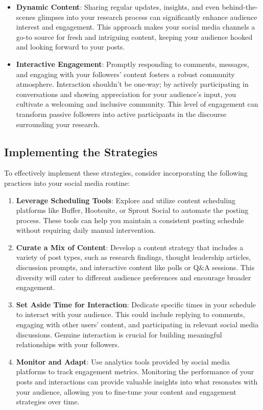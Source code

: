 \documentclass[
]{book}
\begin{document}
\begin{itemize}
\item
  \textbf{Dynamic Content}: Sharing regular updates, insights, and even behind-the-scenes glimpses into your research process can significantly enhance audience interest and engagement. This approach makes your social media channels a go-to source for fresh and intriguing content, keeping your audience hooked and looking forward to your posts.
\item
  \textbf{Interactive Engagement}: Promptly responding to comments, messages, and engaging with your followers' content fosters a robust community atmosphere. Interaction shouldn't be one-way; by actively participating in conversations and showing appreciation for your audience's input, you cultivate a welcoming and inclusive community. This level of engagement can transform passive followers into active participants in the discourse surrounding your research.
\end{itemize}

\hypertarget{implementing-the-strategies-1}{%
\subsection*{Implementing the Strategies}\label{implementing-the-strategies-1}}

To effectively implement these strategies, consider incorporating the following practices into your social media routine:

\begin{enumerate}
\def\labelenumi{\arabic{enumi}.}
\item
  \textbf{Leverage Scheduling Tools}: Explore and utilize content scheduling platforms like Buffer, Hootsuite, or Sprout Social to automate the posting process. These tools can help you maintain a consistent posting schedule without requiring daily manual intervention.
\item
  \textbf{Curate a Mix of Content}: Develop a content strategy that includes a variety of post types, such as research findings, thought leadership articles, discussion prompts, and interactive content like polls or Q\&A sessions. This diversity will cater to different audience preferences and encourage broader engagement.
\item
  \textbf{Set Aside Time for Interaction}: Dedicate specific times in your schedule to interact with your audience. This could include replying to comments, engaging with other users' content, and participating in relevant social media discussions. Genuine interaction is crucial for building meaningful relationships with your followers.
\item
  \textbf{Monitor and Adapt}: Use analytics tools provided by social media platforms to track engagement metrics. Monitoring the performance of your posts and interactions can provide valuable insights into what resonates with your audience, allowing you to fine-tune your content and engagement strategies over time.
\end{enumerate}
\end{document}
